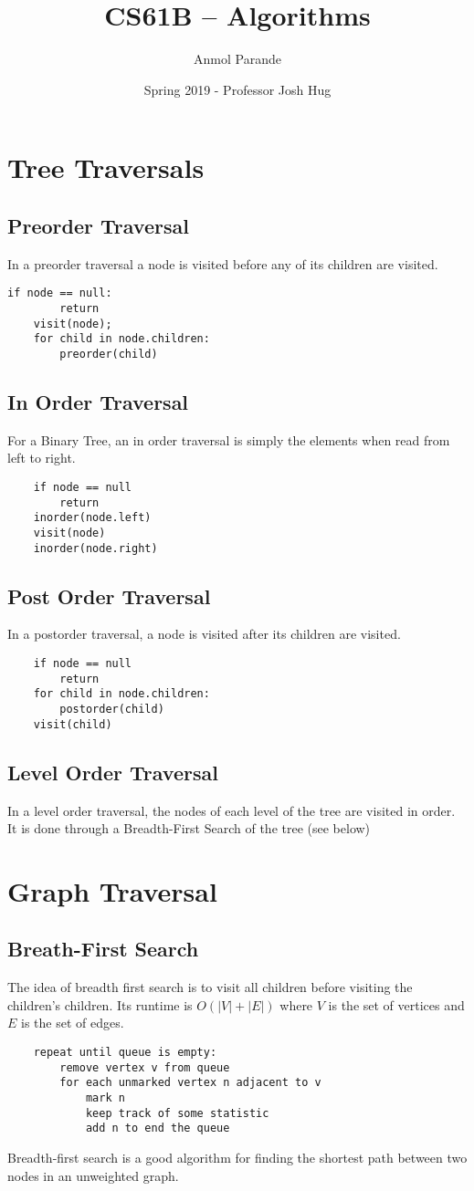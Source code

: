\documentclass{article}
\begin{document}
    \title{CS61B -- Algorithms}
    \author{Anmol Parande}
    \date{Spring 2019 - Professor Josh Hug}
    \maketitle

\section{Tree Traversals}
\subsection{Preorder Traversal}
In a preorder traversal a node is visited before any of its children are visited.
\begin{lstlisting}[]
    if node == null:
        return
    visit(node);
    for child in node.children:
        preorder(child)
\end{lstlisting}
\subsection{In Order Traversal}
For a Binary Tree, an in order traversal is simply the elements when read from left to right.
\begin{lstlisting}
    if node == null
        return
    inorder(node.left)
    visit(node)
    inorder(node.right)
\end{lstlisting}
\subsection{Post Order Traversal}
In a postorder traversal, a node is visited after its children are visited.
\begin{lstlisting}
    if node == null
        return
    for child in node.children:
        postorder(child)
    visit(child)
\end{lstlisting}
\subsection{Level Order Traversal}
In a level order traversal, the nodes of each level of the tree are visited in order.
It is done through a Breadth-First Search of the tree (see below)
\section{Graph Traversal}
\subsection{Breath-First Search}
The idea of breadth first search is to visit all children before visiting the children's children.
Its runtime is $O(|V|+|E|)$ where $V$ is the set of vertices and $E$ is the set of edges.
\begin{lstlisting}
    repeat until queue is empty:
        remove vertex v from queue
        for each unmarked vertex n adjacent to v
            mark n
            keep track of some statistic
            add n to end the queue
\end{lstlisting}
Breadth-first search is a good algorithm for finding the shortest path between two nodes in an unweighted graph.
\end{document}
